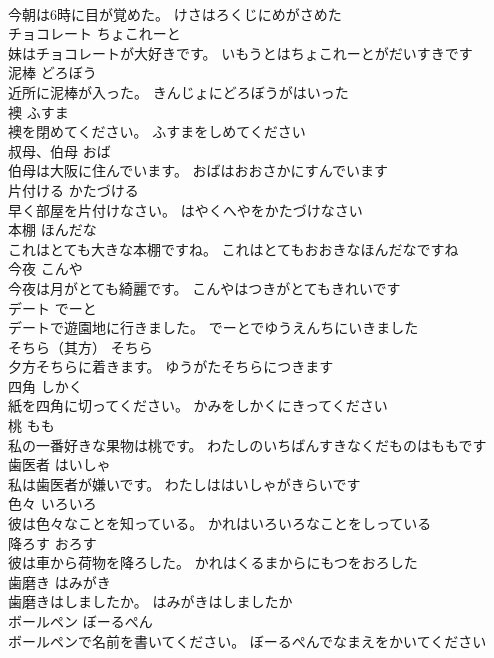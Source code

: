 \documentclass[8pt]{extreport}
\begin{document}
\begin{CJK}{UTF8}{min}
\\	今朝は6時に目が覚めた。	けさはろくじにめがさめた	
\\	チョコレート	ちょこれーと	
\\	妹はチョコレートが大好きです。	いもうとはちょこれーとがだいすきです	
\\	泥棒	どろぼう	
\\	近所に泥棒が入った。	きんじょにどろぼうがはいった	
\\	襖	ふすま	
\\	襖を閉めてください。	ふすまをしめてください	
\\	叔母、伯母	おば	
\\	伯母は大阪に住んでいます。	おばはおおさかにすんでいます	
\\	片付ける	かたづける	
\\	早く部屋を片付けなさい。	はやくへやをかたづけなさい	
\\	本棚	ほんだな	
\\	これはとても大きな本棚ですね。	これはとてもおおきなほんだなですね	
\\	今夜	こんや	
\\	今夜は月がとても綺麗です。	こんやはつきがとてもきれいです	
\\	デート	でーと	
\\	デートで遊園地に行きました。	でーとでゆうえんちにいきました	
\\	そちら（其方）	そちら	
\\	夕方そちらに着きます。	ゆうがたそちらにつきます	
\\	四角	しかく	
\\	紙を四角に切ってください。	かみをしかくにきってください	
\\	桃	もも	
\\	私の一番好きな果物は桃です。	わたしのいちばんすきなくだものはももです	
\\	歯医者	はいしゃ	
\\	私は歯医者が嫌いです。	わたしははいしゃがきらいです	
\\	色々	いろいろ	
\\	彼は色々なことを知っている。	かれはいろいろなことをしっている	
\\	降ろす	おろす	
\\	彼は車から荷物を降ろした。	かれはくるまからにもつをおろした	
\\	歯磨き	はみがき	
\\	歯磨きはしましたか。	はみがきはしましたか	
\\	ボールペン	ぼーるぺん	
\\	ボールペンで名前を書いてください。	ぼーるぺんでなまえをかいてください	

\end{CJK}
\end{document}
